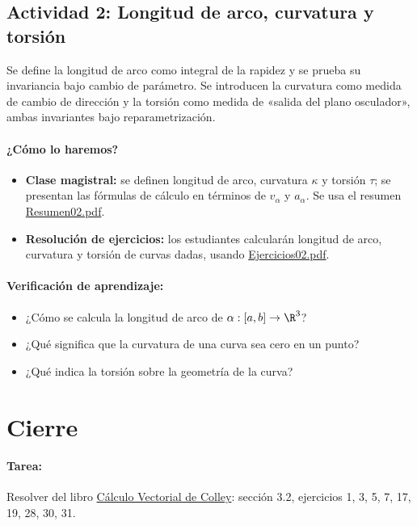 \documentclass[a4,11pt]{aleph-notas}
\begin{document}
\subsection*{Actividad 2: Longitud de arco, curvatura y torsión}
Se define la longitud de arco como integral de la rapidez y se prueba su invariancia bajo cambio de parámetro. Se introducen la curvatura como medida de cambio de dirección y la torsión como medida de «salida del plano osculador», ambas invariantes bajo reparametrización.

\paragraph{¿Cómo lo haremos?}
\begin{itemize}[leftmargin=*]
    \item \textbf{Clase magistral:} se definen longitud de arco, curvatura $\kappa$ y torsión $\tau$; se presentan las fórmulas de cálculo en términos de $v_\alpha$ y $a_\alpha$. Se usa el resumen \href{https://andres-merino.github.io/MatematicaIII-05-N0051/01Resumen/Resumen02.pdf}{Resumen02.pdf}. 
    \item \textbf{Resolución de ejercicios:} los estudiantes calcularán longitud de arco, curvatura y torsión de curvas dadas, usando \href{https://andres-merino.github.io/MatematicaIII-05-N0051/04Ejercicios/Ejercicios02.pdf}{Ejercicios02.pdf}.
\end{itemize}

\paragraph{Verificación de aprendizaje:}
\begin{itemize}[leftmargin=*]
    \item ¿Cómo se calcula la longitud de arco de $\alpha:[a,b]\to\R^3$?
    \item ¿Qué significa que la curvatura de una curva sea cero en un punto?
    \item ¿Qué indica la torsión sobre la geometría de la curva?
\end{itemize}

\section*{Cierre}

\paragraph{Tarea:}
Resolver del libro \href{https://catalogobiblioteca.puce.edu.ec/cgi-bin/koha/opac-detail.pl?biblionumber=83405&query_desc=su%3A%22An%C3%A1lisis%20vectorial%22}{Cálculo Vectorial de Colley}: sección 3.2, ejercicios 1, 3, 5, 7, 17, 19, 28, 30, 31.
\end{document}
